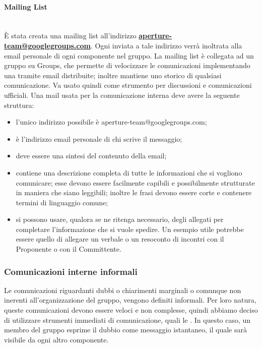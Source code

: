 \paragraph{Mailing List} \hfill \\
È stata creata una mailing list all'indirizzo \textbf{\url{aperture-team@googlegroups.com}}.
Ogni  inviata a tale indirizzo verrà inoltrata alla email personale di ogni componente nel gruppo.
La mailing list è collegata ad un gruppo su  Groups, che permette di velocizzare le comunicazioni implementando una  tramite email distribuite; inoltre mantiene uno storico di qualsiasi comunicazione. Va usato quindi come strumento per discussioni e comunicazioni ufficiali.
Una mail usata per la comunicazione interna deve avere la seguente struttura:
\begin{itemize}
\item {} l'unico indirizzo possibile è aperture-team@googlegroups.com;
\item {} è l'indirizzo email personale di chi scrive il messaggio;
\item {} deve essere una sintesi del contenuto della email;
\item {} contiene una descrizione completa di tutte le informazioni che si vogliono comunicare; esse devono essere facilmente capibili e possibilmente strutturate in maniera che siano leggibili; inoltre le frasi devono essere corte e contenere termini di linguaggio comune;
\item {} si possono usare, qualora se ne ritenga necessario, degli allegati per completare l'informazione che si vuole spedire. Un esempio utile potrebbe essere quello di allegare un verbale o un resoconto di incontri con il Proponente  o con il Committente.
\end{itemize}


\subsubsection{Comunicazioni interne informali}
Le comunicazioni riguardanti dubbi o chiarimenti marginali o comunque non inerenti all'organizzazione del gruppo, vengono definiti informali. Per loro natura, queste comunicazioni devono essere veloci e non complesse, quindi abbiamo deciso di utilizzare strumenti immediati di comunicazione, quali le . In questo caso, un membro del gruppo esprime il dubbio come messaggio istantaneo, il quale sarà visibile da ogni altro componente.

